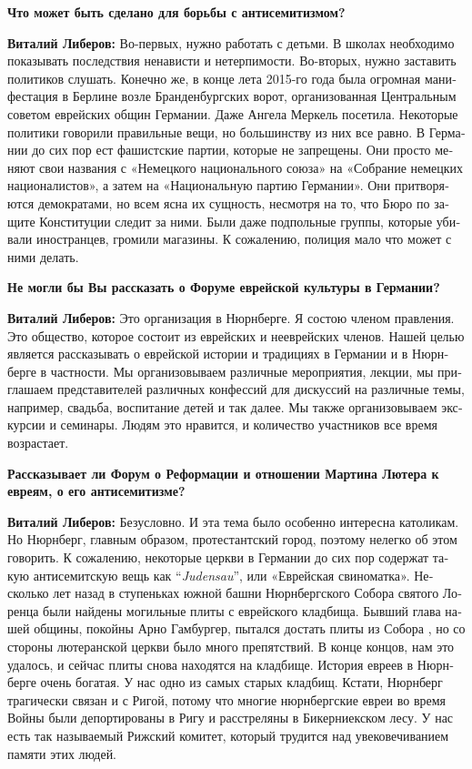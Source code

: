 \begin{otherlanguage}{russian}
	\textbf{Что может быть сделано для борьбы с антисемитизмом?} 
	
	\textbf{Виталий Либеров:} Во-первых, нужно работать с детьми. В школах необходимо показывать последствия ненависти и нетерпимости. Во-вторых, нужно заставить политиков слушать. Конечно же, в конце лета 2015-го года была огромная манифестация в Берлине возле Бранденбургских ворот, организованная Центральным советом еврейских общин Германии. Даже Ангела Меркель посетила. Некоторые политики говорили правильные вещи, но большинству из них все равно. В Германии до сих пор ест фашистские партии, которые не запрещены. Они просто меняют свои названия с «Немецкого национального союза» на «Собрание немецких националистов», а затем на «Национальную партию Германии». Они притворяются демократами, но всем ясна их сущность, несмотря на то, что Бюро по защите Конституции следит за ними. Были даже подпольные группы, которые убивали иностранцев, громили магазины. К сожалению, полиция мало что может с ними делать. 
	
	\textbf{Не могли бы Вы рассказать о Форуме еврейской культуры в Германии?} 
	
	\textbf{Виталий Либеров:} Это организация в Нюрнберге. Я состою членом правления. Это общество, которое состоит из еврейских и нееврейских членов. Нашей целью является рассказывать о еврейской истории и традициях в Германии и в Нюрнберге в частности. Мы организовываем различные мероприятия, лекции, мы приглашаем представителей различных конфессий для дискуссий на различные темы, например, свадьба, воспитание детей и так далее. Мы также организовываем экскурсии и семинары. Людям это нравится, и количество участников все время возрастает. 
	
	\textbf{Рассказывает ли Форум о Реформации и отношении Мартина Лютера к евреям, о его антисемитизме?} 
	
	\textbf{Виталий Либеров:} Безусловно. И эта тема было особенно интересна католикам. Но Нюрнберг, главным образом, протестантский город, поэтому нелегко об этом говорить. К сожалению, некоторые церкви в Германии до сих пор содержат такую антисемитскую вещь как ``\textit{Judensau}'', или «Еврейская свиноматка». Несколько лет назад в ступеньках южной башни Нюрнбергского Собора святого Лоренца были найдены могильные плиты с еврейского кладбища. Бывший глава нашей общины, покойны Арно Гамбургер, пытался достать плиты из Собора , но со стороны лютеранской церкви было много препятствий. В конце концов, нам это удалось, и сейчас плиты снова находятся на кладбище. История евреев в Нюрнберге очень богатая. У нас одно из самых старых кладбищ. Кстати, Нюрнберг трагически связан и с Ригой, потому что многие нюрнбергские евреи во время Войны были депортированы в Ригу и расстреляны в Бикерниекском лесу. У нас есть так называемый Рижский комитет, который трудится над увековечиванием памяти этих людей.    
\end{otherlanguage} 
\newpage
